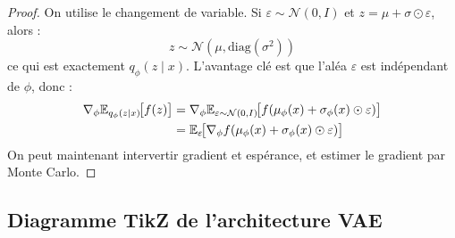 \begin{proof}
On utilise le changement de variable. Si $\varepsilon \sim \mathcal{N}(0, I)$ et $z = \mu + \sigma \odot \varepsilon$, alors :
\begin{equation}
z \sim \mathcal{N}(\mu, \text{diag}(\sigma^2))
\end{equation}
ce qui est exactement $q_\phi(z \mid x)$. L'avantage cl\'e est que l'al\'ea $\varepsilon$ est ind\'ependant de $\phi$, donc :
\begin{align}
\nabla_\phi \mathbb{E}_{q_\phi(z|x)}\!\big[f(z)\big] &= \nabla_\phi \mathbb{E}_{\varepsilon \sim \mathcal{N}(0,I)}\!\big[f(\mu_\phi(x) + \sigma_\phi(x) \odot \varepsilon)\big] \\
&= \mathbb{E}_{\varepsilon}\!\big[\nabla_\phi f(\mu_\phi(x) + \sigma_\phi(x) \odot \varepsilon)\big]
\end{align}
On peut maintenant intervertir gradient et esp\'erance, et estimer le gradient par Monte Carlo.
\end{proof}

\subsection{Diagramme TikZ de l'architecture VAE}

